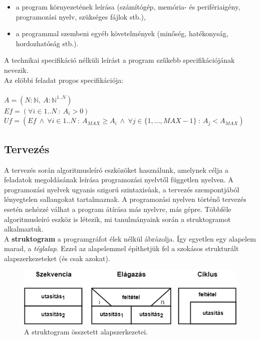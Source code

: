 \documentclass[12pt,margin=0px]{article}
\begin{document}
	\begin{itemize}
		\item a program környezetének leírása (számítógép, memória- és perifériaigény, programozási nyelv, szükséges fájlok stb.),
		\item a programmal szembeni egyéb követelmények (minőség, hatékonyság, hordozhatóság stb.).
	\end{itemize}

	\noindent A technikai specifikáció nélküli leírást a program szűkebb specifikációjának nevezik.\\
	
	\noindent Az elöbbi feladat progos specifikációja:\\\\
	$A=(N : \mathbb{N},\ A: \mathbb{N}^{1..N})$\\
	$Ef=(\forall i \in {1..N}\ :\ A_{i} > 0)$\\
	$Uf=(Ef\ \land\ \forall i \in {1..N}\ :\ A_{MAX} \geq A_{i}\ \land\ \forall j \in \{1, ... ,MAX-1\}\ :\ A_{j} < A_{MAX})$

	\subsection*{Tervezés}
	
    A tervezés során algoritmusleíró eszközöket használunk, amelynek célja a feladatok megoldásának leírása programozási nyelvtől független nyelven. A programozási nyelvek ugyanis szigorú szintaxisúak, a tervezés szempontjából lényegtelen sallangokat tartalmaznak. A programozási nyelven történő tervezés esetén nehézzé válhat a program átírása más nyelvre, más gépre. Többféle algoritmusleíró eszköz is létezik, mi tanulmányaink során a struktogramot alkalmaztuk.\\
	
    \noindent A \textbf{struktogram} a programgráfot élek nélkül ábrázolja. Így egyetlen egy alapelem marad, a \emph{téglalap}. Ezzel az alapelemmel építhetjük fel a szokásos strukturált alapszerkezeteket (és csak azokat).

		\begin{figure}[H]
			\centering
			\includegraphics[width=0.7\linewidth]{img/stuki_alapszerk1}
			\caption{A struktogram összetett alapszerkezetei.}
			\label{fig:stuki_alapszerk1}
		\end{figure}
\end{document}
